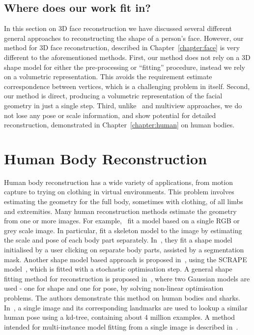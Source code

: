 \subsection{Where does our work fit in?}

In this section on 3D face reconstruction we have discussed several
different general approaches to reconstructing the shape of a person's
face. However, our method for 3D face reconstruction, described in
Chapter~\ref{chapter:face} is very different to the aforementioned
methods. First, our method does not rely on a 3D shape model for
either the pre-processing or ``fitting'' procedure, instead we rely on
a volumetric representation. This avoids the requirement estimate
correspondence between vertices, which is a challenging problem in
itself. Second, our method is direct, producing a volumetric
representation of the facial geometry in just a single step. Third,
unlike~\cite{tran2018extreme} and multiview approaches, we do not lose
any pose or scale information, and show potential for detailed
reconstruction, demonstrated in Chapter~\ref{chapter:human} on human
bodies.




\section{Human Body Reconstruction}

Human body reconstruction has a wide variety of applications, from
motion capture to trying on clothing in virtual environments. This
problem involves estimating the geometry for the full body, sometimes
with clothing, of all limbs and extremities. Many human reconstruction
methods estimate the geometry from one or more images. For
example,~\cite{balan2007detailed,grest2005human,guan2009estimating}
fit a model based on a single RGB or grey scale image. In particular,
\cite{grest2005human} fit a skeleton model to the image by estimating
the scale and pose of each body part
separately. In~\cite{guan2009estimating}, they fit a shape model
initialised by a user clicking on separate body parts, assisted by a
segmentation mask. Another shape model based approach is proposed
in~\cite{balan2007detailed}, using the SCRAPE
model~\cite{anguelov2005scape}, which is fitted with a stochastic
optimisation step. A general shape fitting method for reconstruction
is proposed in~\cite{chen2010inferring}, where two Gaussian models are
used - one for shape and one for pose, by solving non-linear
optimisation problems. The authors demonstrate this method on human
bodies and sharks. In~\cite{jiang20103d}, a single image and its
corresponding landmarks are used to lookup a similar human pose using
a kd-tree, containing about 4 million examples. A method intended for
multi-instance model fitting from a single image is described
in~\cite{Zanfir_2018_CVPR}.

